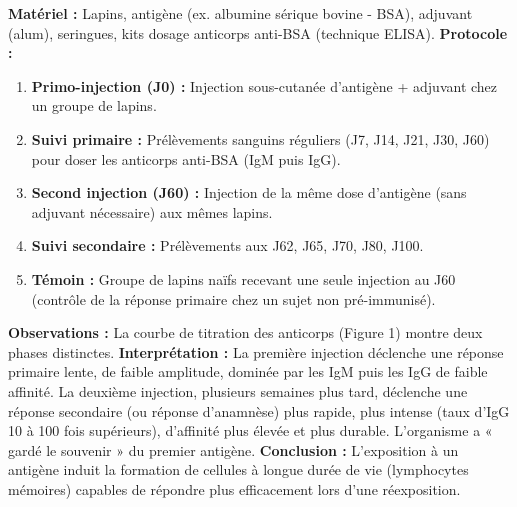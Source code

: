 \documentclass[11pt]{article}
\newcommand{\cle}[1]{{\popxbold\color{popdark}#1}}
\begin{document}
\begin{experience}
\textbf{Matériel :} Lapins, antigène (ex. albumine sérique bovine - BSA), adjuvant (alum), seringues, kits dosage anticorps anti-BSA (technique ELISA).
\textbf{Protocole :}
\begin{enumerate}
    \item \textbf{Primo-injection (J0) :} Injection sous-cutanée d'antigène + adjuvant chez un groupe de lapins.
    \item \textbf{Suivi primaire :} Prélèvements sanguins réguliers (J7, J14, J21, J30, J60) pour doser les anticorps anti-BSA (IgM puis IgG).
    \item \textbf{Second injection (J60) :} Injection de la même dose d'antigène (sans adjuvant nécessaire) aux mêmes lapins.
    \item \textbf{Suivi secondaire :} Prélèvements aux J62, J65, J70, J80, J100.
    \item \textbf{Témoin :} Groupe de lapins naïfs recevant une seule injection au J60 (contrôle de la réponse primaire chez un sujet non pré-immunisé).
\end{enumerate}
\textbf{Observations :} La courbe de titration des anticorps (Figure 1) montre deux phases distinctes.
\textbf{Interprétation :} La première injection déclenche une \cle{réponse primaire} lente, de faible amplitude, dominée par les IgM puis les IgG de faible affinité. La deuxième injection, plusieurs semaines plus tard, déclenche une \cle{réponse secondaire} (ou réponse d'anamnèse) plus rapide, plus intense (taux d'IgG 10 à 100 fois supérieurs), d'affinité plus élevée et plus durable. L'organisme a « gardé le souvenir » du premier antigène.
\textbf{Conclusion :} L'exposition à un antigène induit la formation de cellules à longue durée de vie (lymphocytes mémoires) capables de répondre plus efficacement lors d'une réexposition.
\end{experience}
\end{document}
